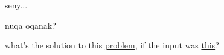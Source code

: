 \noindent
seny...

nuqa oqanak?





what's the solution to this \href{https://po2punkt0.kattis.com/problems/laviner/en}{problem},
if the input was \href{https://github.com/hairez/random-files/blob/main/cool-numbers-001.txt}{this}? 

